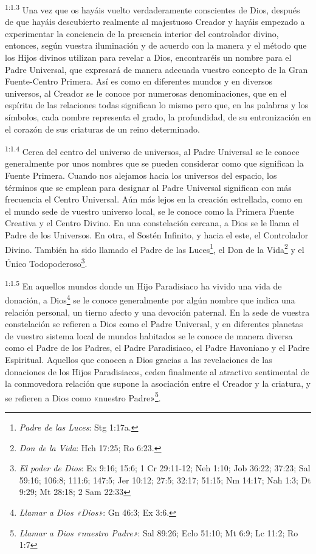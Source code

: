 \par
\textsuperscript{1:1.3} Una vez que os hayáis vuelto verdaderamente conscientes de Dios, después de que hayáis descubierto realmente al majestuoso Creador y hayáis empezado a experimentar la conciencia de la presencia interior del controlador divino, entonces, según vuestra iluminación y de acuerdo con la manera y el método que los Hijos divinos utilizan para revelar a Dios, encontraréis un nombre para el Padre Universal, que expresará de manera adecuada vuestro concepto de la Gran Fuente-Centro Primera. Así es como en diferentes mundos y en diversos universos, al Creador se le conoce por numerosas denominaciones, que en el espíritu de las relaciones todas significan lo mismo pero que, en las palabras y los símbolos, cada nombre representa el grado, la profundidad, de su entronización en el corazón de sus criaturas de un reino determinado.

\par
\textsuperscript{1:1.4} Cerca del centro del universo de universos, al Padre Universal se le conoce generalmente por unos nombres que se pueden considerar como que significan la Fuente Primera. Cuando nos alejamos hacia los universos del espacio, los términos que se emplean para designar al Padre Universal significan con más frecuencia el Centro Universal. Aún más lejos en la creación estrellada, como en el mundo sede de vuestro universo local, se le conoce como la Primera Fuente Creativa y el Centro Divino. En una constelación cercana, a Dios se le llama el Padre de los Universos. En otra, el Sostén Infinito, y hacia el este, el Controlador Divino. También ha sido llamado el Padre de las Luces\footnote{\textit{Padre de las Luces}: Stg 1:17a.}, el Don de la Vida\footnote{\textit{Don de la Vida}: Hch 17:25; Ro 6:23.} y el Único Todopoderoso\footnote{\textit{El poder de Dios}: Ex 9:16; 15:6; 1 Cr 29:11-12; Neh 1:10; Job 36:22; 37:23; Sal 59:16; 106:8; 111:6; 147:5; Jer 10:12; 27:5; 32:17; 51:15; Nm 14:17; Nah 1:3; Dt 9:29; Mt 28:18; 2 Sam 22:33}.

\par
\textsuperscript{1:1.5} En aquellos mundos donde un Hijo Paradisiaco ha vivido una vida de donación, a Dios\footnote{\textit{Llamar a Dios «Dios»}: Gn 46:3; Ex 3:6.} se le conoce generalmente por algún nombre que indica una relación personal, un tierno afecto y una devoción paternal. En la sede de vuestra constelación se refieren a Dios como el Padre Universal, y en diferentes planetas de vuestro sistema local de mundos habitados se le conoce de manera diversa como el Padre de los Padres, el Padre Paradisiaco, el Padre Havoniano y el Padre Espiritual. Aquellos que conocen a Dios gracias a las revelaciones de las donaciones de los Hijos Paradisiacos, ceden finalmente al atractivo sentimental de la conmovedora relación que supone la asociación entre el Creador y la criatura, y se refieren a Dios como «nuestro Padre»\footnote{\textit{Llamar a Dios «nuestro Padre»}: Sal 89:26; Eclo 51:10; Mt 6:9; Lc 11:2; Ro 1:7}.

